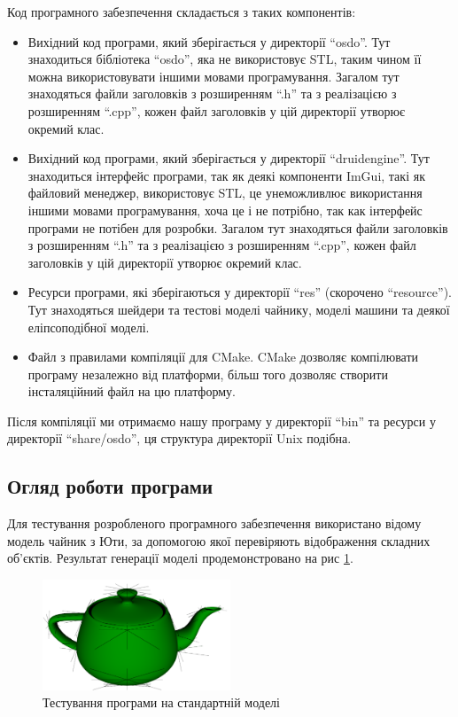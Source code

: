 \let\mypdfximage\pdfximage\def\pdfximage{\immediate\mypdfximage}\documentclass[14pt,a4paper]{extarticle}
\theoremstyle{definition}
\renewcommand{\[}{\begin{singlespace}\begin{equation*}}
\renewcommand{\]}{\end{equation*}\end{singlespace}}
\renewcommand{\+}{\discretionary{\mbox{\scriptsize$\hookleftarrow$}}{}{}}
\begin{document}
Код програмного забезпечення складається з таких компонентів:
\begin{itemize}
\item Вихідний код програми, який зберігається у директорії ``osdo''. Тут знаходиться бібліотека ``osdo'', яка не використовує STL, таким чином її можна використовувати іншими мовами програмування. Загалом тут знаходяться файли заголовків з розширенням ``.h'' та з реалізацією з розширенням ``.cpp'', кожен файл заголовків у цій директорії утворює окремий клас.
\item Вихідний код програми, який зберігається у директорії ``druidengine''. Тут знаходиться інтерфейс програми, так як деякі компоненти ImGui, такі як файловий менеджер, використовує STL, це унеможливлює використання іншими мовами програмування, хоча це і не потрібно, так как інтерфейс програми не потібен для розробки. Загалом тут знаходяться файли заголовків з розширенням ``.h'' та з реалізацією з розширенням ``.cpp'', кожен файл заголовків у цій директорії утворює окремий клас.
\item Ресурси програми, які зберігаються у директорії ``res'' (скорочено ``resource''). Тут знаходяться шейдери та тестові моделі чайнику, моделі машини та деякої еліпсоподібної моделі.
\item Файл з правилами компіляції для CMake. CMake дозволяє компілювати програму незалежно від платформи, більш того дозволяє створити інсталяційний файл на цю платформу.
\end{itemize}

Після компіляції ми отримаємо нашу програму у директорії ``bin'' та ресурси у директорії ``share/osdo'', ця структура директорії Unix подібна.

\subsection{Огляд роботи програми}

Для тестування розробленого програмного забезпечення використано відому модель чайник з Юти, за допомогою якої перевіряють відображення складних об'єктів.  Результат генерації моделі продемонстровано на рис \ref{fig:testing-teapot}.

\begin{figure}[!htb]
    \centering
    \includegraphics[width=0.5\textwidth]{testing-teapot.png}
    \caption{Тестування програми на стандартній моделі}\label{fig:testing-teapot}
\end{figure}
\end{document}
